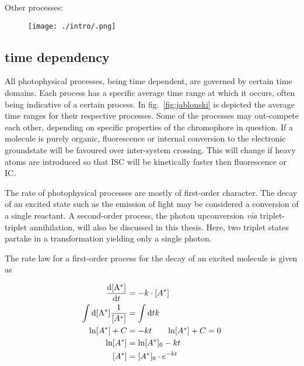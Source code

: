 		Other processes:

		\begin{figure}[!h]
			\centering
			\label{fig:}
			\texttt{[image: ./intro/.png]}
			\caption{}
		\end{figure}
 		
 	
		\subsection{time dependency}%
		All photophysical processes, being time dependent, are governed by certain time domains. Each process has a specific average time range at which it occurs, often being indicative of a certain process. In fig.~\ref{fig:jablonski} is depicted the average time ranges for their respective processes. Some of the processes may out-compete each other, depending on specific properties of the chromophore in question. If a molecule is purely organic, fluorescence or internal conversion to the electronic groundstate will be favoured over inter-system crossing. This will change if heavy atoms are introduced so that ISC will be kinetically faster then fluorescence or IC. 

		The rate of photophysical processes are mostly of first-order character. The decay of an excited state such as the emission of light  may be considered a conversion of a single reactant. A second-order process, the photon upconversion \textit{via} triplet-triplet annihilation, will also be discussed in this thesis. Here, two triplet states partake in a transformation yielding only a single photon. 

		The rate law for a first-order process for the decay of an excited molecule  is given as 

		\begin{equation}
		\label{eq:rate}
		\begin{split}
			\frac{\mathrm{d}[\mathrm{A^{\ast}}]}{\mathrm{d}t} &= - k\cdot[A^{\ast}] \\
			\int\mathrm{d}[\mathrm{A^{\ast}}]\frac{1}{[A^{\ast}]} &= \int\mathrm{d}t k \\
			\ln[A^{\ast}] + C &= -kt \tag*{$\ln[A^{\ast}] + C = 0$} \\
			\ln[A^{\ast}] &= \ln[A^{\ast}]_0 -kt \\
			[A^{\ast}] &= [A^{\ast}]_0 \cdot e^{-kt}
		\end{split}
		\end{equation}

